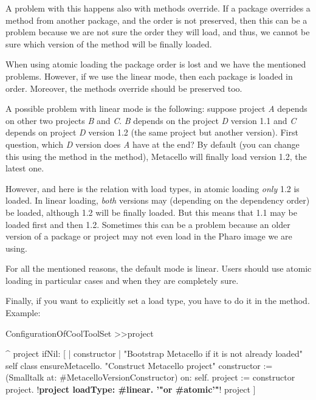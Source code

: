 \documentclass[a4paper,10pt,twoside]{book}
\begin{document}
A problem with this happens also with methods override. If a package overrides a method from another package, and the order is not preserved, then this can be a problem because we are not sure the order they will load, and thus, we cannot be sure which version of the method will be finally loaded. 

When using atomic loading the package order is lost and we have the mentioned problems. However, if we use the linear mode, then each package is loaded in order. Moreover, the methods override should be preserved too. 

A possible problem with linear mode is the following: suppose project \emph{A} depends on other two projects \emph{B} and \emph{C}. \emph{B} depends on the project \emph{D} version 1.1 and \emph{C} depends on project \emph{D} version 1.2 (the same project but another version). First question, which \emph{D} version does \emph{A} have at the end?  By default (you can change this using the method  in the  method), Metacello will finally load version 1.2, \ie the latest one.

However, and here is the relation with load types, in atomic loading \emph{only} 1.2 is loaded. In linear loading, \emph{both} versions may (depending on the dependency order) be loaded, although 1.2 will be finally loaded. But this means that 1.1 may be loaded first and then 1.2. Sometimes this can be a problem because an older version of a package or project may not even load in the Pharo image we are using. 

For all the mentioned reasons, the default mode is linear. Users should use atomic loading in particular cases and when they are completely sure. 

Finally, if you want to explicitly set a load type, you have to do it in the  method. Example:

\begin{code}{}
ConfigurationOfCoolToolSet >>project

       ^ project ifNil: [ | constructor |
              "Bootstrap Metacello if it is not already loaded"
              self class ensureMetacello.
              "Construct Metacello project"
              constructor := (Smalltalk at: #MetacelloVersionConstructor) on: self.
              project := constructor project.
              !\textbf{project loadType: \#linear. '"or \#atomic'"}!
              project ]

\end{code}
\end{document}
